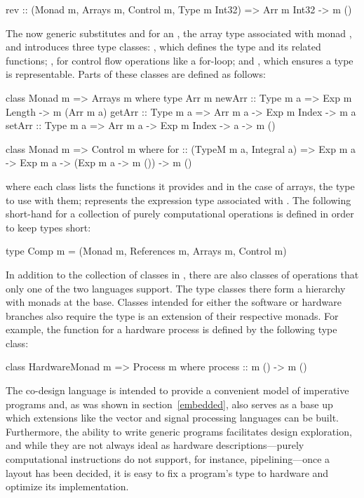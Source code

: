 \documentclass[../paper.tex]{subfiles}
\begin{document}
\begin{code}
rev :: (Monad m, Arrays m, Control m, Type m Int32) => Arr m Int32 -> m ()
\end{code}

\noindent The now generic  substitutes  and  for an , the array type associated with monad , and introduces three type classes: , which defines the  type and its related functions; , for control flow operations like a for-loop; and , which ensures a type is representable. Parts of these classes are defined as follows:

\begin{code}
class Monad m => Arrays m where
  type Arr m
  newArr :: Type m a => Exp m Length -> m (Arr m a)
  getArr :: Type m a => Arr m a -> Exp m Index -> m a
  setArr :: Type m a => Arr m a -> Exp m Index -> a -> m ()

class Monad m => Control m where
  for :: (TypeM m a, Integral a) => Exp m a -> Exp m a -> (Exp m a -> m ())
      -> m ()
\end{code}

\noindent where each class lists the functions it provides and in the case of arrays, the type to use with them;  represents the expression type associated with . The following short-hand for a collection of purely computational operations is defined in order to keep types short:

\begin{code}
type Comp m = (Monad m, References m, Arrays m, Control m)
\end{code}

In addition to the collection of classes in , there are also classes of operations that only one of the two languages support. The type classes there form a hierarchy with monads at the base. Classes intended for either the software or hardware branches also require the type is an extension of their respective monads. For example, the function for a hardware process is defined by the following type class:

\begin{code}
class HardwareMonad m => Process m where
  process :: m () -> m ()
\end{code}

The co-design language is intended to provide a convenient model of imperative programs and, as was shown in section~\ref{embedded}, also serves as a base up which extensions like the vector and signal processing languages can be built. Furthermore, the ability to write generic programs facilitates design exploration, and while they are not always ideal as hardware descriptions---purely computational instructions do not support, for instance, pipelining---once a layout has been decided, it is easy to fix a program's type to hardware and optimize its implementation.
\end{document}
